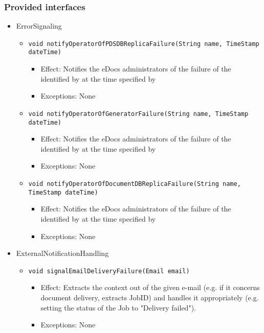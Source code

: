 \subsubsection*{Provided interfaces}
\begin{itemize}
    \item ErrorSignaling
    \begin{itemize}
        \item \texttt{void notifyOperatorOfPDSDBReplicaFailure(String name, TimeStamp dateTime)}
        \begin{itemize}
            \item Effect: Notifies the eDocs administrators of the failure of the  identified by  at the time specified by 
            \item Exceptions: None
        \end{itemize}

        \item \texttt{void notifyOperatorOfGeneratorFailure(String name, TimeStamp dateTime)}
        \begin{itemize}
            \item Effect: Notifies the eDocs administrators of the failure of the  identified by  at the time specified by 
            \item Exceptions: None
        \end{itemize}

		\item \texttt{void notifyOperatorOfDocumentDBReplicaFailure(String name, TimeStamp dateTime)}
        \begin{itemize}
            \item Effect: Notifies the eDocs administrators of the failure of the  identified by  at the time specified by 
            \item Exceptions: None
        \end{itemize}
    \end{itemize}

    \item ExternalNotificationHandling
    \begin{itemize}
        \item \texttt{void signalEmailDeliveryFailure(Email email)}
        \begin{itemize}
            \item Effect: Extracts the context out of the given e-mail (e.g. if it concerns document delivery, extracts JobID) and handles it appropriately (e.g. setting the status of the Job to "Delivery failed").
            \item Exceptions: None
        \end{itemize}


\end{itemize}
\end{itemize}

